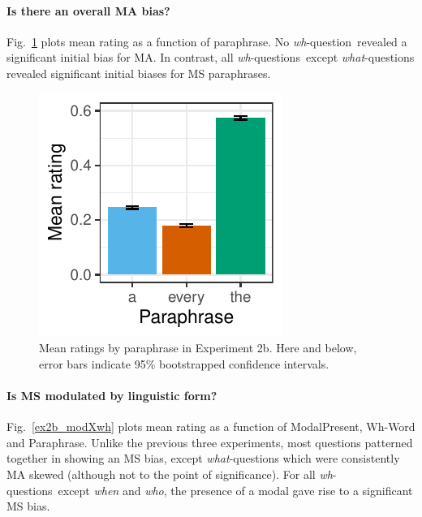 \documentclass[12pt,letterpaper,table,svgnames,dvipsnames]{article}
\newcommand{\figref}[1]{Fig.~\ref{#1}}
\newcommand{\whq}{\emph{wh}-question~}
\newcommand{\whqs}{\emph{wh}-questions~}
\begin{document}
\paragraph{Is there an overall MA bias?}
\figref{ex2b_overall} plots mean rating as a function of paraphrase. No \whq revealed a significant initial bias for MA. In contrast, all \whqs except \emph{what}-questions revealed significant initial biases for MS paraphrases. 

\begin{figure}[h!]
\centering
\centering
\includegraphics[scale=1]{figures/overall_nocontext_embedded.pdf}
\caption{Mean ratings by paraphrase in Experiment 2b. Here and below, error bars indicate 95\% bootstrapped confidence intervals.}
\label{ex2b_overall}
\end{figure}


\paragraph{Is MS modulated by linguistic form?}
\figref{ex2b_modXwh} plots mean rating as a function of ModalPresent, Wh-Word and Paraphrase. Unlike the previous three experiments, most questions patterned together in showing an MS bias, except \emph{what}-questions which were consistently MA skewed (although not to the point of significance). For all \whqs except \emph{when} and \emph{who}, the presence of a modal gave rise to a significant MS bias. 
\end{document}
